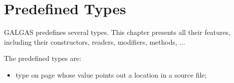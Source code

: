 \chapter{Predefined Types} \label{predefinedTypes}

GALGAS predefines several types. This chapter presents all their features, including their constructors, readers, modifiers, methods, ...


\begin{description}
\item The predefined types are:
\begin{itemize}
\item {} type on page \pageref{@location} whose value points out a location in a source file;
\end{itemize}
\end{description}



